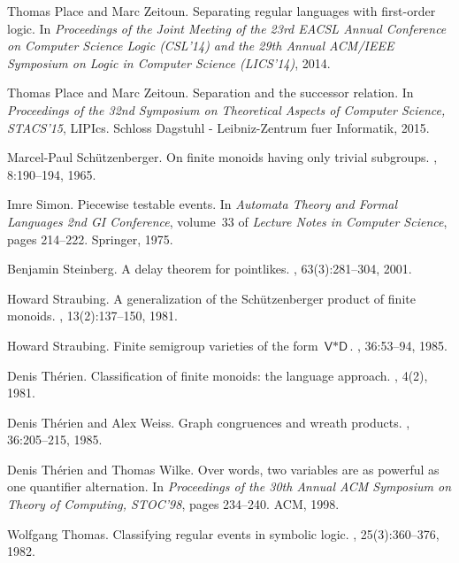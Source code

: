 \documentclass[a4paper,USenglish]{lipics}
\theoremstyle{plain}
\begin{document}
\begin{thebibliography}{10}
Thomas Place and Marc Zeitoun.
\newblock Separating regular languages with first-order logic.
\newblock In {\em Proceedings of the Joint Meeting of the 23rd EACSL Annual
  Conference on Computer Science Logic (CSL'14) and the 29th Annual ACM/IEEE
  Symposium on Logic in Computer Science (LICS'14)}, 2014.

Thomas Place and Marc Zeitoun.
\newblock Separation and the successor relation.
\newblock In {\em Proceedings of the 32nd Symposium on Theoretical Aspects of
  Computer Science, STACS'15}, LIPIcs. Schloss Dagstuhl - Leibniz-Zentrum fuer
  Informatik, 2015.

Marcel-Paul Sch{\"u}tzenberger.
\newblock On finite monoids having only trivial subgroups.
, 8:190--194, 1965.

Imre Simon.
\newblock Piecewise testable events.
\newblock In {\em Automata Theory and Formal Languages 2nd GI Conference},
  volume~33 of {\em Lecture Notes in Computer Science}, pages 214--222.
  Springer, 1975.

Benjamin Steinberg.
\newblock A delay theorem for pointlikes.
, 63(3):281--304, 2001.

Howard Straubing.
\newblock A generalization of the {S}ch{\"u}tzenberger product of finite
  monoids.
, 13(2):137--150, 1981.

Howard Straubing.
\newblock Finite semigroup varieties of the form $\textsf{{V}}*\textsf{{D}}$.
, 36:53--94, 1985.

Denis Th{\'e}rien.
\newblock Classification of finite monoids: the language approach.
, 4(2), 1981.

Denis Th{\'e}rien and Alex Weiss.
\newblock Graph congruences and wreath products.
, 36:205--215, 1985.

Denis Th\'{e}rien and Thomas Wilke.
\newblock Over words, two variables are as powerful as one quantifier
  alternation.
\newblock In {\em Proceedings of the 30th Annual ACM Symposium on Theory of
  Computing, STOC'98}, pages 234--240. ACM, 1998.

Wolfgang Thomas.
\newblock Classifying regular events in symbolic logic.
, 25(3):360--376, 1982.


\end{thebibliography}
\end{document}
